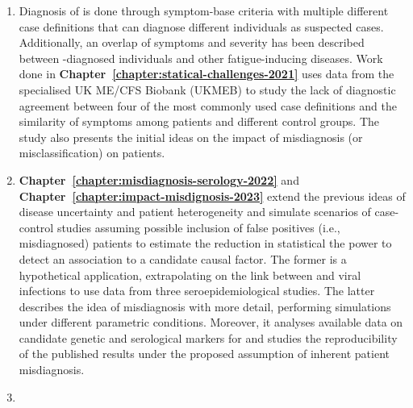 \begin{enumerate}
    \setlength{\itemsep}{1.5pt}
    \setlength{\parskip}{0pt}
    \setlength{\parsep}{0pt}
    
    \item Diagnosis of \cfs is done through symptom-base criteria with multiple different case definitions that can diagnose different individuals as suspected cases. Additionally, an overlap of symptoms and severity has been described between \cfs-diagnosed individuals and other fatigue-inducing diseases. Work done in \textbf{Chapter~\ref{chapter:statical-challenges-2021}} uses data from the specialised UK ME/CFS Biobank (UKMEB) to study the lack of diagnostic agreement between four of the most commonly used \cfs case definitions and the similarity of symptoms among patients and different control groups. The study also presents the initial ideas on the impact of misdiagnosis (or misclassification) on patients.

    \item \textbf{Chapter~\ref{chapter:misdiagnosis-serology-2022}} and \textbf{Chapter~\ref{chapter:impact-misdignosis-2023}} extend the previous ideas of disease uncertainty and patient heterogeneity and simulate scenarios of case-control studies assuming possible inclusion of false positives (i.e., misdiagnosed) patients to estimate the reduction in statistical the power to detect an association to a candidate causal factor. The former is a hypothetical application, extrapolating on the link between \cfs and viral infections to use data from three \covid seroepidemiological studies. The latter describes the idea of misdiagnosis with more detail, performing simulations under different parametric conditions. Moreover, it analyses available data on candidate genetic and serological markers for \cfs and studies the reproducibility of the published results under the proposed assumption of inherent patient misdiagnosis.

    \item {}


\end{enumerate}
